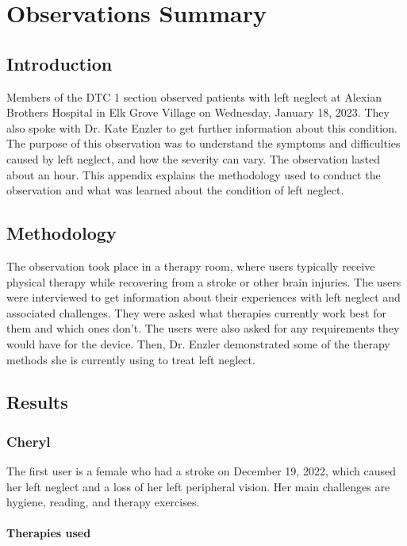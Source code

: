 \chapter{Observations Summary}
\label{chap:observations}

\section{Introduction}

Members of the DTC 1 section observed patients with left neglect at Alexian
Brothers Hospital in Elk Grove Village on Wednesday, January 18, 2023. They
also spoke with Dr. Kate Enzler to get further information about this
condition. The purpose of this observation was to understand the symptoms and
difficulties caused by left neglect, and how the severity can vary. The
observation lasted about an hour. This appendix explains the methodology used
to conduct the observation and what was learned about the condition of left
neglect.

\section{Methodology}

The observation took place in a therapy room, where users typically receive
physical therapy while recovering from a stroke or other brain injuries. The
users were interviewed to get information about their experiences with left
neglect and associated challenges. They were asked what therapies currently
work best for them and which ones don’t. The users were also asked for any
requirements they would have for the device. Then, Dr. Enzler demonstrated some
of the therapy methods she is currently using to treat left neglect.

\section{Results}

\subsection{Cheryl}

The first user is a female who had a stroke on December 19, 2022, which caused
her left neglect and a loss of her left peripheral vision. Her main challenges
are hygiene, reading, and therapy exercises.

\subsubsection{Therapies used}

